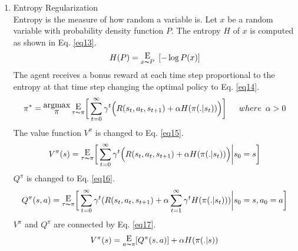     \begin{enumerate}[label={\alph*)}]
        \item Entropy Regularization\\
        Entropy is the measure of how random a variable is. Let $x$ be a random variable with probability density function $P$. The entropy $H$ of $x$ is computed as shown in Eq. \ref{eq13}.
        \begin{equation}
        H(P) = \substack{\mathlarger{\text{E}} \\ x \thicksim P} \hspace{5pt}[-\log P(x)]
        \label{eq13}
    \end{equation}
    The agent receives a bonus reward at each time step proportional to the entropy at that time step changing the optimal policy to Eq. \ref{eq14}.
    \begin{equation}
        \pi^* = \substack{\mathlarger{\text{argmax}} \\ \mathlarger{\pi}} \hspace{2pt} \substack{\mathlarger{\text{E}} \\ \tau \thicksim \pi} \bigg[\sum_{t=0}^{\infty} \gamma^t \Big(R(s_{t}, a_{t}, s_{t+1}) + \alpha H (\pi(.|s_{t})) \Big)\bigg] \hspace{15pt} where \hspace{5pt} \alpha > 0
        \label{eq14}
    \end{equation}
    The value function $V^\pi$ is changed to Eq. \ref{eq15}.
    \begin{equation}
        V^\pi(s) = \substack{\mathlarger{\text{E}} \\ \tau \thicksim \pi} \bigg[\sum_{t=0}^{\infty} \gamma^t \Big(R(s_{t}, a_{t}, s_{t+1}) + \alpha H (\pi(.|s_{t})) \Big) \bigg| s_{0} = s \bigg]
        \label{eq15}
    \end{equation}
    $Q^\pi$ is changed to Eq. \ref{eq16}.
    \begin{equation}
        Q^\pi(s, a) = \substack{\mathlarger{\text{E}} \\ \tau \thicksim \pi} \bigg[\sum_{t=0}^{\infty} \gamma^t (R(s_{t}, a_{t}, s_{t+1}) + \alpha \sum_{t=1}^{\infty} \gamma^t H (\pi(.|s_{t})) ) \bigg| s_{0} = s, a_{0} = a \bigg]
        \label{eq16}
    \end{equation}
    $V^\pi$ and $Q^\pi$ are connected by Eq. \ref{eq17}.
    \begin{equation}
        V^\pi(s) = \substack{\mathlarger{\text{E}} \\ a \thicksim \pi}[Q^\pi(s,a)] + \alpha H (\pi(.|s))

\end{equation}
\end{enumerate}
